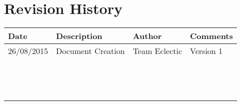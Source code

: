 \documentclass[11pt]{article}
\begin{document}


\setcounter{tocdepth}{3}
\setcounter{secnumdepth}{5}
\tableofcontents

\newpage
\section{Revision History}
\begin{table}[h]
\begin{tabular}{llll}
\textbf{Date}          & \textbf{Description}  & \textbf{Author}       & \textbf{Comments}   \\ \hline
\multicolumn{1}{|R{2cm}|}{26/08/2015} & \multicolumn{1}{L{4.5cm}|}{Document Creation} & \multicolumn{1}{l|}{Team Eclectic} & \multicolumn{1}{L{4cm}|}{Version 1} \\ \hline
\multicolumn{1}{|l|}{} & \multicolumn{1}{l|}{} & \multicolumn{1}{l|}{} & \multicolumn{1}{l|}{} \\ \hline
\multicolumn{1}{|l|}{} & \multicolumn{1}{l|}{} & \multicolumn{1}{l|}{} & \multicolumn{1}{l|}{} \\ \hline
\multicolumn{1}{|l|}{} & \multicolumn{1}{l|}{} & \multicolumn{1}{l|}{} & \multicolumn{1}{l|}{} \\ \hline
\multicolumn{1}{|l|}{} & \multicolumn{1}{l|}{} & \multicolumn{1}{l|}{} & \multicolumn{1}{l|}{} \\ \hline
\multicolumn{1}{|l|}{} & \multicolumn{1}{l|}{} & \multicolumn{1}{l|}{} & \multicolumn{1}{l|}{} \\ \hline
\multicolumn{1}{|l|}{} & \multicolumn{1}{l|}{} & \multicolumn{1}{l|}{} & \multicolumn{1}{l|}{} \\ \hline
\multicolumn{1}{|l|}{} & \multicolumn{1}{l|}{} & \multicolumn{1}{l|}{} & \multicolumn{1}{l|}{} \\ \hline
\multicolumn{1}{|l|}{} & \multicolumn{1}{l|}{} & \multicolumn{1}{l|}{} & \multicolumn{1}{l|}{} \\ \hline
\multicolumn{1}{|l|}{} & \multicolumn{1}{l|}{} & \multicolumn{1}{l|}{} & \multicolumn{1}{l|}{} \\ \hline
\multicolumn{1}{|l|}{} & \multicolumn{1}{l|}{} & \multicolumn{1}{l|}{} & \multicolumn{1}{l|}{} \\ \hline
\multicolumn{1}{|l|}{} & \multicolumn{1}{l|}{} & \multicolumn{1}{l|}{} & \multicolumn{1}{l|}{} \\ \hline
\multicolumn{1}{|l|}{} & \multicolumn{1}{l|}{} & \multicolumn{1}{l|}{} & \multicolumn{1}{l|}{} \\ \hline
\multicolumn{1}{|l|}{} & \multicolumn{1}{l|}{} & \multicolumn{1}{l|}{} & \multicolumn{1}{l|}{} \\ \hline
\multicolumn{1}{|l|}{} & \multicolumn{1}{l|}{} & \multicolumn{1}{l|}{} & \multicolumn{1}{l|}{} \\ \hline
\end{tabular}
\end{table}
\end{document}

